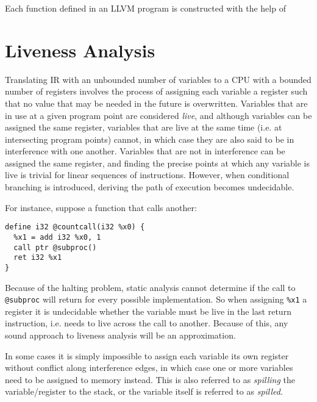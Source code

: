 \documentclass{article}
\begin{document}
Each function defined in an LLVM program is constructed with the help of

\section{Liveness Analysis}

%

Translating IR with an unbounded number of variables to a CPU with a bounded number of registers involves the process of assigning each variable a register such that no value that may be needed in the future is overwritten. %
Variables that are in use at a given program point are considered \textit{live}, and although variables can be assigned the same register, %
variables that are live at the same time (i.e. at intersecting program points) cannot, in which case they are also said to be in interference with one another.
 Variables that are not in interference can be assigned the same register, and finding the precise points at which any variable is live is trivial for linear sequences of instructions. However, when conditional branching is introduced, deriving the path of execution becomes undecidable. %

For instance, suppose a function that calls another:

\begin{verbatim}
define i32 @countcall(i32 %x0) {
  %x1 = add i32 %x0, 1
  call ptr @subproc()
  ret i32 %x1
}
\end{verbatim}
Because of the halting problem, static analysis cannot determine if the call to \lstinline!@subproc! will return for every possible implementation.  %
So when assigning \lstinline!%x1! a register it is undecidable whether the variable must be live in the last return instruction, i.e. needs to live across the call to another. Because of this, any sound approach to liveness analysis will be an approximation.

In some cases it is simply impossible to assign each variable its own register without conflict along interference edges, in which case one or more variables need to be assigned to memory instead. This is also referred to as \textit{spilling} the variable/register to the stack, or the variable itself is referred to as \textit{spilled}.
\end{document}
